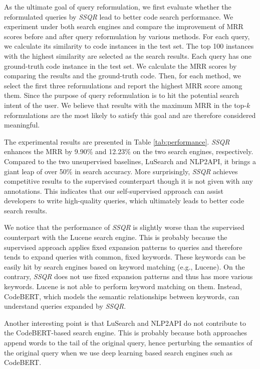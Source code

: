 \documentclass[sigconf,screen]{acmart}
\newcommand{\ourmethod}{\textit{SSQR}\xspace}
\begin{document}
As the ultimate goal of query reformulation, we first evaluate whether the reformulated queries by \ourmethod lead to better code search performance. 
We experiment under both search engines and compare the improvement of MRR scores before and after query reformulation by various methods. For each query, we calculate its similarity to code instances in the test set. The top 100 instances with the highest similarity are selected as the search results. Each query has one ground-truth code instance in the test set. We calculate the MRR scores by comparing the results and the ground-truth code.
Then, for each method, we select the first three reformulations and report the highest MRR score among them. 
Since the purpose of query reformulation is to hit the potential search intent of the user. We believe that results with the maximum MRR in the top-$k$ reformulations are the most likely to satisfy this goal and are therefore considered meaningful.


The experimental results are presented in Table \ref{tab:performance}. \ourmethod enhances the MRR by 9.90\% and 12.23\% on the two search engines, respectively. %
Compared to the two unsupervised baselines, LuSearch and NLP2API, it brings a giant leap of over 50\% in search accuracy. 
More surprisingly, \ourmethod achieves competitive results to the supervised counterpart though it is not given with any annotations. 
This indicates that our self-supervised approach can assist developers to write high-quality queries, which ultimately leads to better code search results. 

We notice that the performance of \ourmethod is slightly worse than the supervised counterpart with the Lucene search engine. This is probably because the supervised approach applies fixed expansion patterns to queries and therefore tends to expand queries with common, fixed keywords. These keywords can be easily hit by search engines based on keyword matching (e.g., Lucene). On the contrary, \ourmethod does not use fixed expansion patterns and thus has more various keywords. Lucene is not able to perform keyword matching on them. Instead, CodeBERT, which models the semantic relationships between keywords, can understand queries expanded by \ourmethod.


Another interesting point is that LuSearch and NLP2API do not contribute to the CodeBERT-based search engine. This is probably because both approaches append words to the tail of the original query, hence perturbing the semantics of the original query when we use deep learning based search engines such as CodeBERT.
\end{document}
